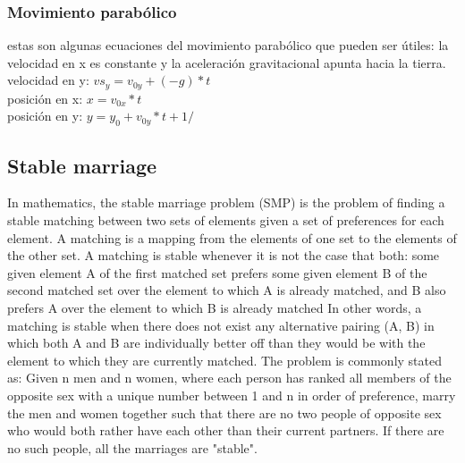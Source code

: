\documentclass[10pt,letterpaper,twocolumn,twosided]{article}
\begin{document}
\subsubsection{Movimiento parabólico} 
estas son algunas ecuaciones del movimiento parabólico que pueden ser útiles:
la velocidad en x es constante y la aceleración gravitacional apunta hacia la tierra.\\

velocidad en y: $ vs_{y} = v_{0y} +(-g)*t   $\\ 
posición en x:  $ x = v_{0x}*t   $\\
posición en y:  $ y = y_{0} + v_{0y}*t + 1/ $ \\

\subsection{Stable marriage}

In mathematics, the stable marriage problem (SMP) is the problem of finding a stable matching between two sets of elements given a set of preferences for each element. A matching is a mapping from the elements of one set to the elements of the other set. A matching is stable whenever it is not the case that both:
some given element A of the first matched set prefers some given element B of the second matched set over the element to which A is already matched, and
B also prefers A over the element to which B is already matched
In other words, a matching is stable when there does not exist any alternative pairing (A, B) in which both A and B are individually better off than they would be with the element to which they are currently matched.
The problem is commonly stated as:
Given n men and n women, where each person has ranked all members of the opposite sex with a unique number between 1 and n in order of preference, marry the men and women together such that there are no two people of opposite sex who would both rather have each other than their current partners. If there are no such people, all the marriages are "stable".
\end{document}
